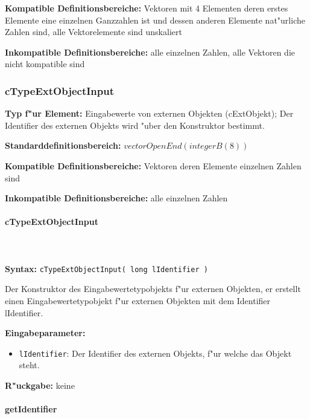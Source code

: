 \bigskip\noindent
\textbf{Kompatible Definitionsbereiche:} Vektoren mit 4 Elementen deren erstes Elemente eine einzelnen Ganzzahlen ist und dessen anderen Elemente nat"urliche Zahlen sind, alle Vektorelemente sind unskaliert

\bigskip\noindent
\textbf{Inkompatible Definitionsbereiche:} alle einzelnen Zahlen, alle Vektoren die nicht kompatible sind


\subsubsection{cTypeExtObjectInput}

\textbf{Typ f"ur Element:} Eingabewerte von externen Objekten (cExtObjekt); Der Identifier des externen Objekts wird "uber den Konstruktor bestimmt.

\bigskip\noindent
\textbf{Standarddefinitionsbereich:} $vectorOpenEnd( integerB(8) )$

\bigskip\noindent
\textbf{Kompatible Definitionsbereiche:} Vektoren deren Elemente einzelnen Zahlen sind

\bigskip\noindent
\textbf{Inkompatible Definitionsbereiche:} alle einzelnen Zahlen


\paragraph{cTypeExtObjectInput}

\ \\\\\noindent
\textbf{Syntax:} \verb|cTypeExtObjectInput( long lIdentifier )|

\bigskip\noindent
Der Konstruktor des Eingabewertetypobjekts f"ur externen Objekten, er erstellt einen Eingabewertetypobjekt f"ur externen Objekten mit dem Identifier lIdentifier.

\bigskip\noindent
\textbf{Eingabeparameter:}
\begin{itemize}
 \item \verb|lIdentifier|: Der Identifier des externen Objekts, f"ur welche das Objekt steht.
\end{itemize}

\bigskip\noindent
\textbf{R"uckgabe:} keine


\paragraph{getIdentifier}

